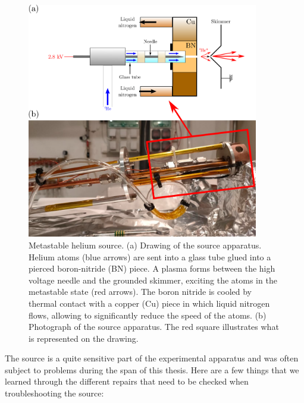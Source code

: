 \begin{figure}
    \centering
    \includegraphics[width=0.9\textwidth]{Fig/Chapter3/source.png}
    \caption[Metastable helium source]{Metastable helium source. (a) Drawing of the source apparatus. Helium atoms (blue arrows) are sent into a glass tube glued into a pierced boron-nitride (BN) piece. A plasma forms between the high voltage needle and the grounded skimmer, exciting the atoms in the metastable state (red arrows). The boron nitride is cooled by thermal contact with a copper (Cu) piece in which liquid nitrogen flows, allowing to significantly reduce the speed of the atoms. (b) Photograph of the source apparatus. The red square illustrates what is represented on the drawing.}
    \label{fig:source}
\end{figure}

The source is a quite sensitive part of the experimental apparatus and was often subject to problems during the span of this thesis. Here are a few things that we learned through the different repairs that need to be checked when troubleshooting the source:

